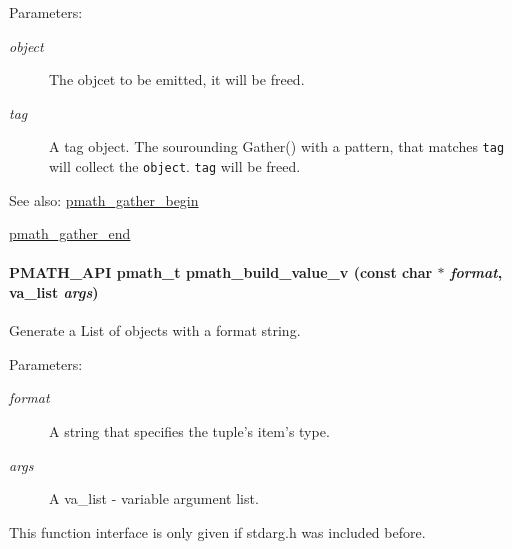 \begin{Desc}
\item[Parameters:]
\begin{description}
\item[{\em object}]The objcet to be emitted, it will be freed. \item[{\em tag}]A tag object. The sourounding Gather() with a pattern, that matches {\tt tag} will collect the {\tt object}. {\tt tag} will be freed.\end{description}
\end{Desc}
\begin{Desc}
\item[See also:]\hyperlink{group__helpers_g077f3730ca4275b87d9a35bce6013e45}{pmath\_\-gather\_\-begin} 

\hyperlink{group__helpers_ga2f732b35703986263e3a15592b4a46e}{pmath\_\-gather\_\-end} \end{Desc}
\hypertarget{group__helpers_g96660afa0732edf675653eb6ddeab0a4}{
\paragraph[{pmath\_\-build\_\-value\_\-v}]{\setlength{\rightskip}{0pt plus 5cm}PMATH\_\-API {\bf pmath\_\-t} pmath\_\-build\_\-value\_\-v (const char $\ast$ {\em format}, \/  va\_\-list {\em args})}\hfill}
\label{group__helpers_g96660afa0732edf675653eb6ddeab0a4}


Generate a List of objects with a format string. 

\begin{Desc}
\item[Parameters:]
\begin{description}
\item[{\em format}]A string that specifies the tuple's item's type. \item[{\em args}]A va\_\-list - variable argument list.\end{description}
\end{Desc}
This function interface is only given if stdarg.h was included before.

